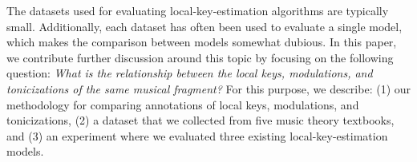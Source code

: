 
The datasets used for evaluating local-key-estimation
algorithms are typically small. Additionally, each dataset
has often been used to evaluate a single model, which makes
the comparison between models somewhat dubious. In this
paper, we contribute further discussion around this topic by
focusing on the following question: \emph{What is the
relationship between the local keys, modulations, and
tonicizations of the same musical fragment?} For this
purpose, we describe: (1) our methodology for comparing
annotations of local keys, modulations, and tonicizations,
(2) a dataset that we collected from five music theory
textbooks, and (3) an experiment where we evaluated three
existing local-key-estimation models.
